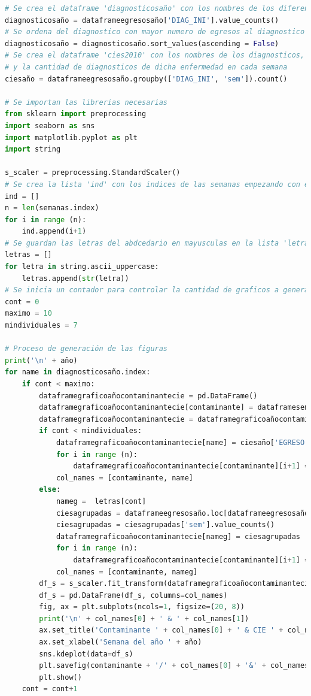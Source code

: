 \begin{lstlisting}[language=Python, caption=Procedimiento del segundo paso, label=lst:c2]
# Se crea el dataframe 'diagnosticosaño' con los nombres de los diferentes diagnosticos sin repeticion
diagnosticosaño = dataframeegresosaño['DIAG_INI'].value_counts()
# Se ordena del diagnostico con mayor numero de egresos al diagnostico con menor numero de egresos
diagnosticosaño = diagnosticosaño.sort_values(ascending = False)
# Se crea el dataframe 'cies2010' con los nombres de los diagnosticos, los numeros de las semanas, 
# y la cantidad de diagnosticos de dicha enfermedad en cada semana
ciesaño = dataframeegresosaño.groupby(['DIAG_INI', 'sem']).count()

# Se importan las librerias necesarias
from sklearn import preprocessing
import seaborn as sns
import matplotlib.pyplot as plt
import string

s_scaler = preprocessing.StandardScaler()
# Se crea la lista 'ind' con los indices de las semanas empezando con el 1
ind = []
n = len(semanas.index)
for i in range (n):
    ind.append(i+1)
# Se guardan las letras del abdcedario en mayusculas en la lista 'letras' para la agrupación de CIEs
letras = []
for letra in string.ascii_uppercase:
    letras.append(str(letra))
# Se inicia un contador para controlar la cantidad de graficos a generar
cont = 0
maximo = 10
mindividuales = 7

# Proceso de generación de las figuras
print('\n' + año)
for name in diagnosticosaño.index:
    if cont < maximo:
        dataframegraficoañocontaminantecie = pd.DataFrame()
        dataframegraficoañocontaminantecie[contaminante] = dataframesemanascontaminanteaño[contaminante]
        dataframegraficoañocontaminantecie = dataframegraficoañocontaminantecie.reindex(ind)
        if cont < mindividuales:
            dataframegraficoañocontaminantecie[name] = ciesaño['EGRESO'][name]
            for i in range (n):
                dataframegraficoañocontaminantecie[contaminante][i+1] = dataframesemanascontaminanteaño[contaminante][i]
            col_names = [contaminante, name]    
        else:
            nameg =  letras[cont]
            ciesagrupadas = dataframeegresosaño.loc[dataframeegresosaño['DIAG_INI'].str.startswith(nameg)]
            ciesagrupadas = ciesagrupadas['sem'].value_counts()
            dataframegraficoañocontaminantecie[nameg] = ciesagrupadas
            for i in range (n):
                dataframegraficoañocontaminantecie[contaminante][i+1] = dataframesemanascontaminanteaño[contaminante][i]
            col_names = [contaminante, nameg]
        df_s = s_scaler.fit_transform(dataframegraficoañocontaminantecie)
        df_s = pd.DataFrame(df_s, columns=col_names)
        fig, ax = plt.subplots(ncols=1, figsize=(20, 8))
        print('\n' + col_names[0] + ' & ' + col_names[1])
        ax.set_title('Contaminante ' + col_names[0] + ' & CIE ' + col_names[1])
        ax.set_xlabel('Semana del año ' + año)
        sns.kdeplot(data=df_s)
        plt.savefig(contaminante + '/' + col_names[0] + '&' + col_names[1] + '_' + año + '.jpg', format='jpg')
        plt.show()
    cont = cont+1
\end{lstlisting}

